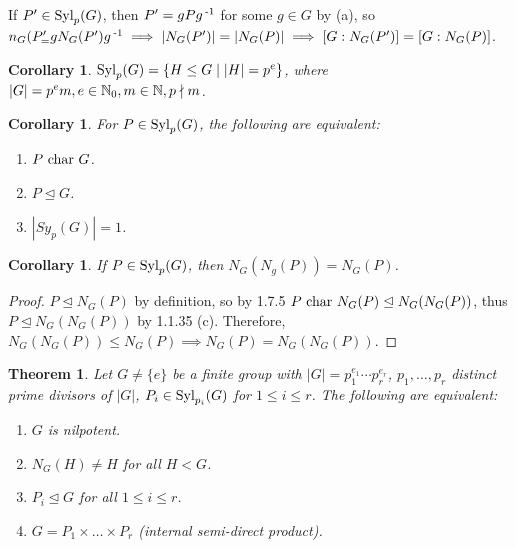 \documentclass[11pt]{book}
\newcounter{counter}
\newtheorem{theorem}[counter]{Theorem}   \newtheorem*{theorem*}{Theorem}   \newtheorem{lemma}[counter]{Lemma}   \newtheorem{corollary}[counter]{Corollary}
\theoremstyle{definition}   \newtheorem{defn}[counter]{Definition} %
\newcommand{\nsg}{\mathrel{\unlhd}}   \newcommand{\ind}{\parindent24pt}   \newcommand{\vn}{\varnothing}
\newcommand{\vs}{\vspace{8pt}}
\numberwithin{counter}{chapter}
\begin{document}
\vs

\begin{remark*}
If $P' \in \textnormal{Syl}_p(G)$, then $P' = gPg\operatorname{^{-1}}$ for some $g \in G$ by (a), so $n_G(P'_ = gN_G(P')g\operatorname{^{-1}} \implies |N_G(P')| = |N_G(P)| \implies [G : N_G(P')] = [G : N_G(P)]$.
\end{remark*}

\vs

\begin{corollary}
$\textnormal{Syl}_p(G) = \{H \leq G \mid |H| = p^e\}$, where $|G| = p^em, e \in \operatorname{\mathbb{N}}_0, m\in \operatorname{\mathbb{N}},p \nmid m$.
\end{corollary}

\vs

\begin{corollary}
For $P \in \textnormal{Syl}_p(G)$, the following are equivalent:
\begin{enumerate}
\item[(i)] $P \textnormal{ char } G$.
\item[(ii)] $P \nsg G$.
\item[(iii)] $|Sy_p(G)| = 1$.
\end{enumerate}
\end{corollary}

\vs

\begin{corollary}
If $P \in \textnormal{Syl}_p(G)$, then $N_G(N_g(P)) = N_G(P)$.
\end{corollary}

\begin{proof}
$P \nsg N_G(P)$ by definition, so by 1.7.5 $P \car N_G(P) \nsg N_G(N_G(P))$, thus $P \nsg N_G(N_G(P))$ by 1.1.35 (c). Therefore, $N_G(N_G(P)) \leq N_G(P) \implies N_G(P) = N_G(N_G(P))$.
\end{proof}

\vs

\begin{theorem}
Let $G \ne \{e\}$ be a finite group with $|G| = p_1^{e_1}\cdots p_r^{e_r}$, $p_1,\dots,p_r$ distinct prime divisors of $|G|$, $P_i \in \textnormal{Syl}_{p_i}(G)$ for $1 \leq i \leq r$. The following are equivalent:
\begin{enumerate}
\item[(i)] $G$ is nilpotent.
\item[(ii)] $N_G(H) \ne H$ for all $H < G$.
\item[(iii)] $P_i \nsg G$ for all $1 \leq i \leq r$.
\item[(iv)] $G = P_1 \times \dots \times P_r$ (internal semi-direct product).
\end{enumerate}
\end{theorem}
\end{document}
